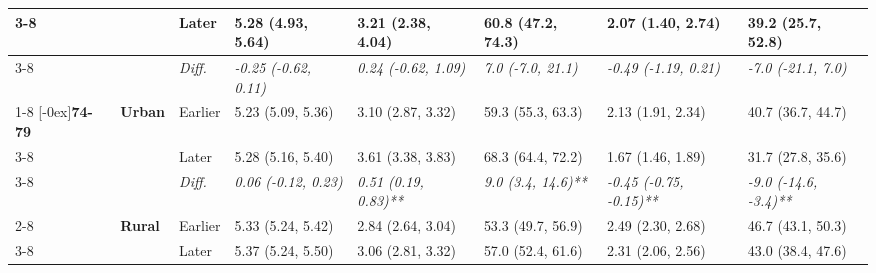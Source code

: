 \documentclass[12pt, a4paper]{article}
\begin{document}
\begin{appendices}
\begin{table}[!p]
{\begin{tabular}[t]{>{}l>{}lllllll}
        \cmidrule{3-8}
                                              &                                 & Later                         & 5.28 (4.93, 5.64)                           & 3.21 (2.38, 4.04)                            & 60.8 (47.2, 74.3)                           & 2.07 (1.40, 2.74)                              & 39.2 (25.7, 52.8)                              \\
        \cmidrule{3-8}
                                              &                                 & \cellcolor{gray!10}\em{Diff.} & \cellcolor{gray!10}\em{-0.25 (-0.62, 0.11)} & \cellcolor{gray!10}\em{0.24 (-0.62, 1.09)}   & \cellcolor{gray!10}\em{7.0 (-7.0, 21.1)}    & \cellcolor{gray!10}\em{-0.49 (-1.19, 0.21)}    & \cellcolor{gray!10}\em{-7.0 (-21.1, 7.0)}      \\
        \cmidrule{1-8}
        \multirow{9}{*}[-0ex]{\textbf{74-79}} & \multirow{3}{*}{\textbf{Urban}} & Earlier                       & 5.23 (5.09, 5.36)                           & 3.10 (2.87, 3.32)                            & 59.3 (55.3, 63.3)                           & 2.13 (1.91, 2.34)                              & 40.7 (36.7, 44.7)                              \\
        \cmidrule{3-8}
                                              &                                 & Later                         & 5.28 (5.16, 5.40)                           & 3.61 (3.38, 3.83)                            & 68.3 (64.4, 72.2)                           & 1.67 (1.46, 1.89)                              & 31.7 (27.8, 35.6)                              \\
        \cmidrule{3-8}
                                              &                                 & \cellcolor{gray!10}\em{Diff.} & \cellcolor{gray!10}\em{0.06 (-0.12, 0.23)}  & \cellcolor{gray!10}\em{0.51 (0.19, 0.83)**}  & \cellcolor{gray!10}\em{9.0 (3.4, 14.6)**}   & \cellcolor{gray!10}\em{-0.45 (-0.75, -0.15)**} & \cellcolor{gray!10}\em{-9.0 (-14.6, -3.4)**}   \\
        \cmidrule{2-8}
                                              & \multirow{3}{*}{\textbf{Rural}} & Earlier                       & 5.33 (5.24, 5.42)                           & 2.84 (2.64, 3.04)                            & 53.3 (49.7, 56.9)                           & 2.49 (2.30, 2.68)                              & 46.7 (43.1, 50.3)                              \\
        \cmidrule{3-8}
                                              &                                 & Later                         & 5.37 (5.24, 5.50)                           & 3.06 (2.81, 3.32)                            & 57.0 (52.4, 61.6)                           & 2.31 (2.06, 2.56)                              & 43.0 (38.4, 47.6)                              \\

\end{tabular}}
\end{table}
\end{appendices}
\end{document}
